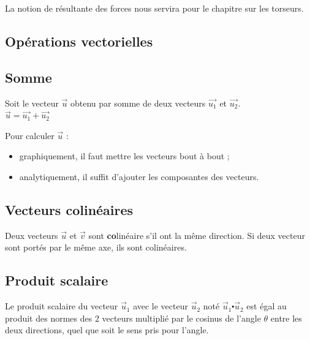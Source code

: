 \documentclass[
	11pt, %
	fleqn, %
	a4paper, %
]{LegrandOrangeBook}
\begin{document}
La notion de résultante des forces nous servira pour le chapitre sur les torseurs.




\subsection{Opérations vectorielles}
\subsection*{Somme}
Soit le vecteur $\Vec{u}$ obtenu par somme de deux vecteurs $\Vec{u_1}$ et $\Vec{u_2}$. \\
$\Vec{u} = \Vec{u_1} + \Vec{u_2}$

Pour calculer $\Vec{u}$ :
\begin{itemize}
    \item graphiquement, il faut mettre les vecteurs bout à bout ;
    \item analytiquement, il suffit d’ajouter les composantes des vecteurs.
\end{itemize}


\subsection*{Vecteurs colinéaires}

Deux vecteurs $\Vec{u}$ et $\Vec{v}$ sont \textbf{co}linéaire s'il ont la même direction. Si deux vecteur sont portés par le même axe, ils sont colinéaires. 




\subsection{Produit scalaire}

Le produit scalaire du vecteur $\Vec{u}_1$ avec le vecteur $\Vec{u}_2$ noté $\Vec{u}_1 \centerdot \Vec{u}_2$ est égal au produit des normes des 2
vecteurs multiplié par le cosinus de l’angle $\theta$ entre les deux directions, quel que soit le sens pris pour l’angle.
\end{document}

